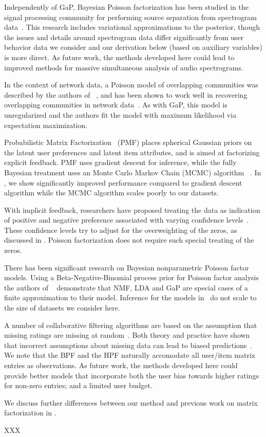 Independently of GaP, Bayesian Poisson factorization has been studied
in the signal processing community for performing source separation
from spectrogram data~\cite{Cemgil:2009,Hoffman:2012}.  This research
includes variational approximations to the posterior, though the
issues and details around spectrogram data differ significantly from
user behavior data we consider and our derivation below (based on
auxiliary variables) is more direct.  As future work, the methods
developed here could lead to improved methods for massive simultaneous
analysis of audio spectrograms. 

In the context of network data, a Poisson model of overlapping
communities was described by the authors of ~\cite{Ball:2011}, and has
been shown to work well in recovering overlapping communities in
network data~\cite{Gopalan:2013}.  As with GaP, this model is
unregularized and the authors fit the model with maximum likelihood
via expectation maximization.

Probabilistic Matrix Factorization~\cite{Salakhutdinov:2008a} (PMF)
places spherical Gaussian priors on the latent user preferences and
latent item attributes, and is aimed at factorizing explicit feedback.
PMF uses gradient descent for inference, while the fully Bayesian
treatment uses an Monte Carlo Markov Chain (MCMC) algorithm
~\cite{Salakhutdinov:2008}.  In , we show significantly
improved performance compared to gradient descent algorithm while the
MCMC algorithm scales poorly to our datasets.

With implicit feedback, researchers have proposed treating the data as
indication of positive and negative preference associated with varying
confidence levels~\cite{Hu:2008p9402}. These confidence levels try to
adjust for the overweighting of the zeros, as discussed in
. Poisson factorization does not require such special
treating of the zeros.

There has been significant research on Bayesian nonparametric Poisson
factor models. Using a Beta-Negative-Binomial process prior for
Poisson factor analysis the authors of ~\cite{Zhou:2012} demonstrate
that NMF, LDA and GaP are special cases of a finite approximation to
their model. Inference for the models in~\cite{Zhou:2012} do not scale
to the size of datasets we consider here.

A number of collaborative filtering algorithms are based on the
assumption that missing ratings are missing at
random~\cite{Marlin:2012}. Both theory and practice have shown that
incorrect assumptions about missing data can lead to biased
predictions~\cite{Marlin:2009}. We note that the BPF and the HPF
naturally accomodate all user/item matrix entries as observations. As
future work, the methods developed here could provide better models
that incorporate both the user bias towards higher ratings for
non-zero entries; and a limited user budget.



We discuss further differences between our method and previous work on
matrix factorization in .

XXX \cite{Marlin:2009,Marlin:2012,Elkan:2008,Ma:2011}
